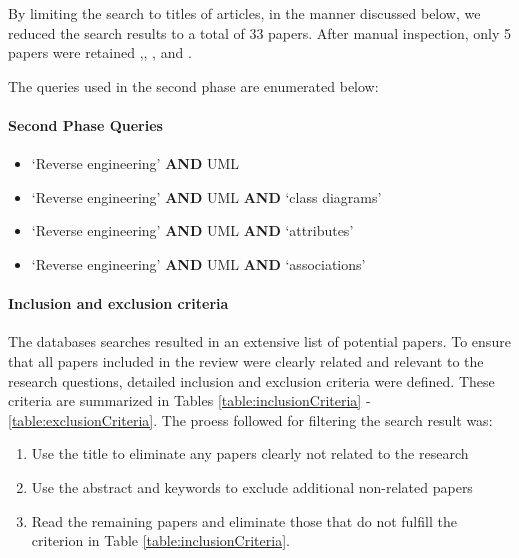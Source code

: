 By limiting the search to titles of articles, in the manner discussed below, we reduced the search results to a total of 33 papers. After manual inspection, only 5 papers were retained \cite{surveyMens},\cite{biehl2010literature}, \cite{DynamicSurvey}, \cite{Nelson1996} and \cite{Chikofsky}. 

The queries used in the second phase are enumerated below:

\paragraph*{Second Phase Queries}

\begin{itemize}
\item `Reverse engineering' \textbf{AND}  UML 
\item `Reverse engineering' \textbf{AND}  UML \textbf{AND} `class diagrams'
\item `Reverse engineering' \textbf{AND}  UML \textbf{AND}  `attributes'
\item `Reverse engineering' \textbf{AND}  UML \textbf{AND} `associations'
\end{itemize}

\paragraph*{Inclusion and exclusion criteria}

The databases searches resulted in an extensive list of potential papers. To ensure that all papers included in the review were clearly related and relevant to the research questions, detailed inclusion and exclusion criteria were defined. These criteria are summarized in Tables \ref{table:inclusionCriteria} - \ref{table:exclusionCriteria}. 
 The proess followed for filtering the search result was:

\begin{enumerate}
\item Use the title to eliminate any papers clearly not related to the research

\item Use the abstract and keywords to exclude additional non-related papers

\item Read the remaining papers and eliminate those that do not fulfill the criterion in Table \ref{table:inclusionCriteria}.
\end{enumerate}

